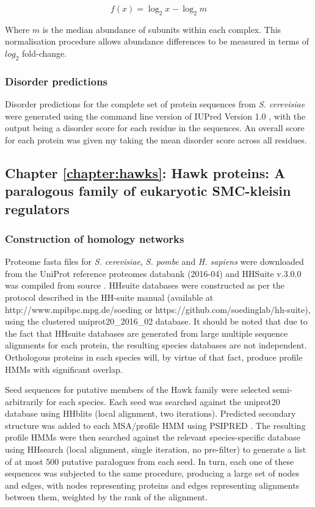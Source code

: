 \documentclass[a4paper,11pt,twoside,openright]{scrbook}
\begin{document}
\begin{displaymath}
    f(x) = \log_2 x - \log_2 m
\end{displaymath}

Where $m$ is the median abundance of subunits within each complex. This normalisation procedure allows abundance differences to be measured in terms of $log_{2}$ fold-change.

\subsubsection{Disorder predictions}
Disorder predictions for the complete set of protein sequences from \textit{S. cerevisiae} were generated using the command line version of IUPred Version 1.0 \cite{Dosztanyi2005a,Dosztanyi2005}, with the output being a disorder score for each residue in the sequences. An overall score for each protein was given my taking the mean disorder score across all residues.

\subsection{Chapter \ref*{chapter:hawks}: Hawk proteins: A paralogous family of eukaryotic SMC-kleisin regulators}\label{subsection:hawkmethods}

\subsubsection{Construction of homology networks}
Proteome fasta files for \textit{S. cerevisiae}, \textit{S. pombe} and \textit{H. sapiens} were downloaded from the UniProt reference proteomes databank \cite{Consortium2017} (2016-04) and HHSuite v.3.0.0 was compiled from source \cite{Soding2005,Remmert2011}. HHsuite databases were constructed as per the protocol described in the HH-suite manual (available at http://www.mpibpc.mpg.de/soeding or https://github.com/soedinglab/hh-suite), using the clustered uniprot20\_2016\_02 database. It should be noted that due to the fact that HHsuite databases are generated from large multiple sequence alignments for each protein, the resulting species databases are not independent. Orthologous proteins in each species will, by virtue of that fact, produce profile HMMs with significant overlap.

Seed sequences for putative members of the Hawk family were selected semi-arbitrarily for each species. Each seed was searched against the uniprot20 database using HHblits \cite{Remmert2011} (local alignment, two iterations). Predicted secondary structure was added to each MSA/profile HMM using PSIPRED \cite{Jones1999}. The resulting profile HMMs were then searched against the relevant species-specific database using HHsearch (local alignment, single iteration, no pre-filter) to generate a list of at most 500 putative paralogues from each seed. In turn, each one of these sequences was subjected to the same procedure, producing a large set of nodes and edges, with nodes representing proteins and edges representing alignments between them, weighted by the rank of the alignment.
\end{document}
